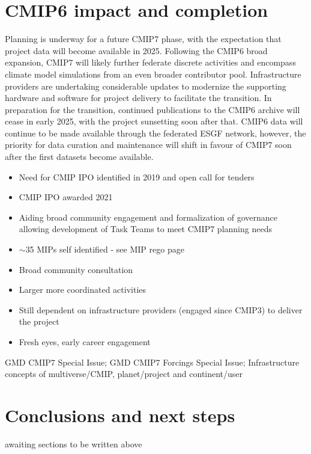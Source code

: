 \documentclass[gmd, preprint]{copernicus}
\def\cred#1{{\color{red}#1}}
\begin{document}
\section{CMIP6 impact and completion}
\label{sec:CMIP6Completion}
Planning is underway for a future CMIP7 phase, with the expectation that project data will become available in 2025. Following the CMIP6 broad expansion, CMIP7 will likely further federate discrete activities and encompass climate model simulations from an even broader contributor pool. Infrastructure providers are undertaking considerable updates to modernize the supporting hardware and software for project delivery to facilitate the transition. In preparation for the transition, continued publications to the CMIP6 archive will cease in early 2025, with the project sunsetting soon after that. CMIP6 data will continue to be made available through the federated ESGF network, however, the priority for data curation and maintenance will shift in favour of CMIP7 soon after the first datasets become available.

\cred{
\begin{itemize}
	\item Need for CMIP IPO identified in 2019 and open call for tenders
	\item CMIP IPO awarded 2021
	\item Aiding broad community engagement and formalization of governance allowing development of Task Teams to meet CMIP7 planning needs
	\item $\sim$35 MIPs self identified - see MIP rego page
	\item Broad community consultation
	\item Larger more coordinated activities
	\item Still dependent on infrastructure providers (engaged since CMIP3) to deliver the project
    \item Fresh eyes, early career engagement
\end{itemize}
}

\cred{GMD CMIP7 Special Issue; GMD CMIP7 Forcings Special Issue; Infrastructure concepts of multiverse/CMIP, planet/project and continent/user}



\section{Conclusions and next steps} %
\label{sec:Conclusions}
\cred{awaiting sections to be written above}
\end{document}
